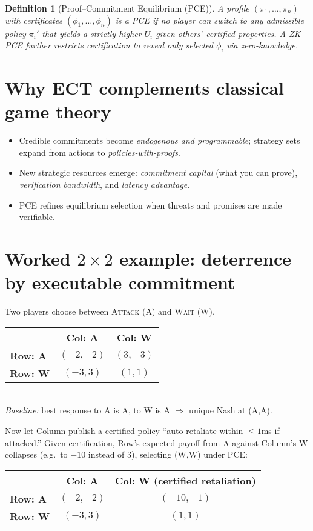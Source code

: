 \documentclass[11pt]{article}
\newtheorem{definition}{Definition}
\newcommand{\Ui}{U_i}
\begin{document}
\begin{definition}[Proof--Commitment Equilibrium (PCE)]
A profile $(\pi_1,\ldots,\pi_n)$ with certificates $(\phi_1,\ldots,\phi_n)$ is a PCE if no player can switch to any \emph{admissible} policy $\pi_i'$ that yields a strictly higher $\Ui$ given others' certified properties. A \emph{ZK--PCE} further restricts certification to reveal only selected $\phi_i$ via zero-knowledge.
\end{definition}

\section*{Why ECT complements classical game theory}
\begin{itemize}[leftmargin=1.2em]
  \item Credible commitments become \emph{endogenous and programmable}; strategy sets expand from actions to \emph{policies-with-proofs}.
  \item New strategic resources emerge: \emph{commitment capital} (what you can prove), \emph{verification bandwidth}, and \emph{latency advantage}.
  \item PCE refines equilibrium selection when threats and promises are made verifiable.
\end{itemize}

\section*{Worked $2\times 2$ example: deterrence by executable commitment}
Two players choose between \textsc{Attack} (A) and \textsc{Wait} (W).
\begin{center}
\begin{tabular}{@{}lcc@{}}
\toprule
 & \textbf{Col: A} & \textbf{Col: W} \\
\midrule
\textbf{Row: A} & $(-2,-2)$ & $(3,-3)$ \\
\textbf{Row: W} & $(-3,3)$ & $(1,1)$ \\
\bottomrule
\end{tabular}\\[0.5em]
\emph{Baseline:} best response to A is A, to W is A $\Rightarrow$ unique Nash at (A,A).
\end{center}

Now let Column publish a certified policy ``auto-retaliate within $\le 1$ms if attacked.'' Given certification, Row's expected payoff from A against Column's W collapses (e.g.\ to $-10$ instead of $3$), selecting (W,W) under PCE:
\begin{center}
\begin{tabular}{@{}lcc@{}}
\toprule
 & \textbf{Col: A} & \textbf{Col: W (certified retaliation)} \\
\midrule
\textbf{Row: A} & $(-2,-2)$ & $(-10,-1)$ \\
\textbf{Row: W} & $(-3,3)$ & $(1,1)$ \\
\bottomrule
\end{tabular}
\end{center}
\end{document}
